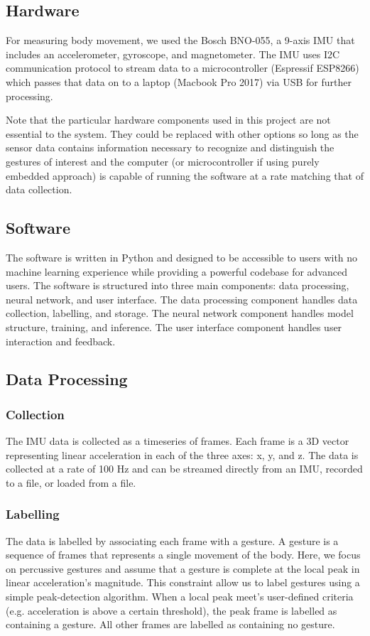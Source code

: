 \documentclass{article}
\begin{document}
\subsection{Hardware}
For measuring body movement, we used the Bosch BNO-055, a 9-axis IMU that includes an accelerometer, gyroscope, and magnetometer. The IMU uses I2C communication protocol to stream data to a microcontroller (Espressif ESP8266) which passes that data on to a laptop  (Macbook Pro 2017) via USB for further processing.

Note that the particular hardware components used in this project are not essential to the system. They could be replaced with other options so long as the sensor data contains information necessary to recognize and distinguish the gestures of interest and the computer (or microcontroller if using purely embedded approach) is capable of running the software at a rate matching that of data collection.

\subsection{Software}
The software is written in Python and designed to be accessible to users with no machine learning experience while providing a powerful codebase for advanced users. The software is structured into three main components: data processing, neural network, and user interface. The data processing component handles data collection, labelling, and storage. The neural network component handles model structure, training, and inference. The user interface component handles user interaction and feedback. 


\subsection{Data Processing}
\subsubsection{Collection}
The IMU data is collected as a timeseries of frames. Each frame is a 3D vector representing linear acceleration in each of the three axes: x, y, and z. The data is collected at a rate of 100 Hz and can be streamed directly from an IMU, recorded to a file, or loaded from a file.

\subsubsection{Labelling}
The data is labelled by associating each frame with a gesture. A gesture is a sequence of frames that represents a single movement of the body. Here, we focus on percussive gestures and assume that a gesture is complete at the local peak in linear acceleration's magnitude. This constraint allow us to label gestures using a simple peak-detection algorithm. When a local peak meet's user-defined criteria (e.g. acceleration is above a certain threshold), the peak frame is labelled as containing a gesture. All other frames are labelled as containing no gesture.
\end{document}
